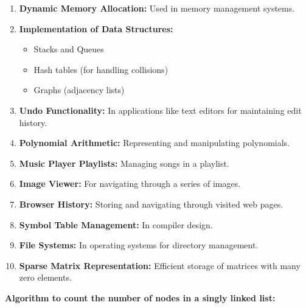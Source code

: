\begin{enumerate}
\def\labelenumi{\arabic{enumi}.}
\tightlist
\item
  \textbf{Dynamic Memory Allocation:} Used in memory management systems.
\item
  \textbf{Implementation of Data Structures:}

  \begin{itemize}
  \tightlist
  \item
    Stacks and Queues
  \item
    Hash tables (for handling collisions)
  \item
    Graphs (adjacency lists)
  \end{itemize}
\item
  \textbf{Undo Functionality:} In applications like text editors for
  maintaining edit history.
\item
  \textbf{Polynomial Arithmetic:} Representing and manipulating
  polynomials.
\item
  \textbf{Music Player Playlists:} Managing songs in a playlist.
\item
  \textbf{Image Viewer:} For navigating through a series of images.
\item
  \textbf{Browser History:} Storing and navigating through visited web
  pages.
\item
  \textbf{Symbol Table Management:} In compiler design.
\item
  \textbf{File Systems:} In operating systems for directory management.
\item
  \textbf{Sparse Matrix Representation:} Efficient storage of matrices
  with many zero elements.
\end{enumerate}

\textbf{Algorithm to count the number of nodes in a singly linked list:}

\begin{Shaded}
\begin{Highlighting}[]
\OperatorTok{=} 
    
\OperatorTok{=}
    
      \NormalTok{:}
\OperatorTok{+=} 
        
\OperatorTok{=}
    
\end{Highlighting}
\end{Shaded}

